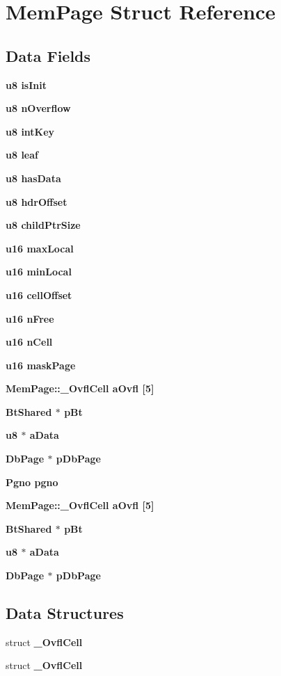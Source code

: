\section{Mem\-Page Struct Reference}
\label{structMemPage}
\subsection*{Data Fields}
\begin{CompactItemize}
\item 
\bf{u8} \bf{is\-Init}
\item 
\bf{u8} \bf{n\-Overflow}
\item 
\bf{u8} \bf{int\-Key}
\item 
\bf{u8} \bf{leaf}
\item 
\bf{u8} \bf{has\-Data}
\item 
\bf{u8} \bf{hdr\-Offset}
\item 
\bf{u8} \bf{child\-Ptr\-Size}
\item 
\bf{u16} \bf{max\-Local}
\item 
\bf{u16} \bf{min\-Local}
\item 
\bf{u16} \bf{cell\-Offset}
\item 
\bf{u16} \bf{n\-Free}
\item 
\bf{u16} \bf{n\-Cell}
\item 
\bf{u16} \bf{mask\-Page}
\item 
\bf{Mem\-Page::\_\-Ovfl\-Cell} \bf{a\-Ovfl} [5]
\item 
\bf{Bt\-Shared} $\ast$ \bf{p\-Bt}
\item 
\bf{u8} $\ast$ \bf{a\-Data}
\item 
\bf{Db\-Page} $\ast$ \bf{p\-Db\-Page}
\item 
\bf{Pgno} \bf{pgno}
\item 
\bf{Mem\-Page::\_\-Ovfl\-Cell} \bf{a\-Ovfl} [5]
\item 
\bf{Bt\-Shared} $\ast$ \bf{p\-Bt}
\item 
\bf{u8} $\ast$ \bf{a\-Data}
\item 
\bf{Db\-Page} $\ast$ \bf{p\-Db\-Page}
\end{CompactItemize}
\subsection*{Data Structures}
\begin{CompactItemize}
\item 
struct \bf{\_\-Ovfl\-Cell}
\item 
struct \bf{\_\-Ovfl\-Cell}
\end{CompactItemize}


